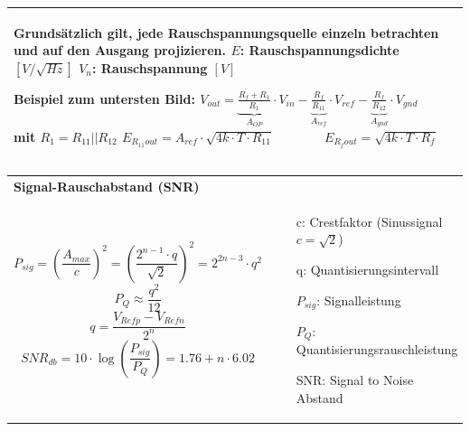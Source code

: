 \begin{longtable}[t]{|p{4cm}|p{13.8cm}|}
{    Grundsätzlich gilt, jede Rauschspannungsquelle einzeln betrachten und auf den Ausgang projizieren. 
    \newline
    \newline
    $E$: Rauschspannungsdichte $[V/\sqrt{Hz}]$ \newline
    $V_n$: Rauschspannung $[V]$ \newline
    
    \textbf{Beispiel zum untersten Bild:} \newline
    $V_{out} = \underbrace{\frac{R_f + R_1}{R_1}}_{A_{OP}} \cdot V_{in} - \underbrace{\frac{R_f}{R_{11}}}_{A_{ref}}
    \cdot V_{ref} - \underbrace{\frac{R_f}{R_{12}}}_{A_{gnd}} \cdot V_{gnd}$ \qquad mit $R_1 = R_{11} || R_{12}$ \newline
    $E_{R_{11}out} = A_{ref} \cdot \sqrt{4k \cdot T \cdot R_{11}} \qquad  \qquad E_{R_fout} = \sqrt{4k \cdot T \cdot R_f}$
    }
    \\ \hline
\end{longtable}    
    
\newpage


\vspace{-2.5\topsep}
\begin{longtable}[t]{|p{9cm}|p{9cm}|}
  \hline  
    \multicolumn{2}{|l|}{\bf Signal-Rauschabstand (SNR)} \\
  \hdashline
    \vspace{-1.5\topsep}
    \[ P_{sig} = \left(\frac{A_{max}}{c}\right)^2=\left(\frac{2^{n-1}\cdot q}{\sqrt 2}\right)^2 = 2^{2n-3}\cdot q^2\]    
    \newline
    \[ P_Q \approx \frac{q^2}{12} \] \newline
    \[ q = \frac{V_{Refp}-V_{Refn}}{2^n} \]  \newline
    \[ SNR_{db} = 10 \cdot \log\left(\frac{P_{sig}}{P_Q}\right) = 1.76+n \cdot 6.02 \] &
    \vspace{-1.5\topsep}
    \begin{itemize}
      \item[c:] Crestfaktor (Sinussignal $c=\sqrt 2$)
      \item[q:] Quantisierungsintervall
      \item[$P_{sig}$:] Signalleistung
      \item[$P_Q$:] Quantisierungsrauschleistung
      \item[SNR:] Signal to Noise Abstand
    \end{itemize} \\
  \hline
\end{longtable}
    
    
    